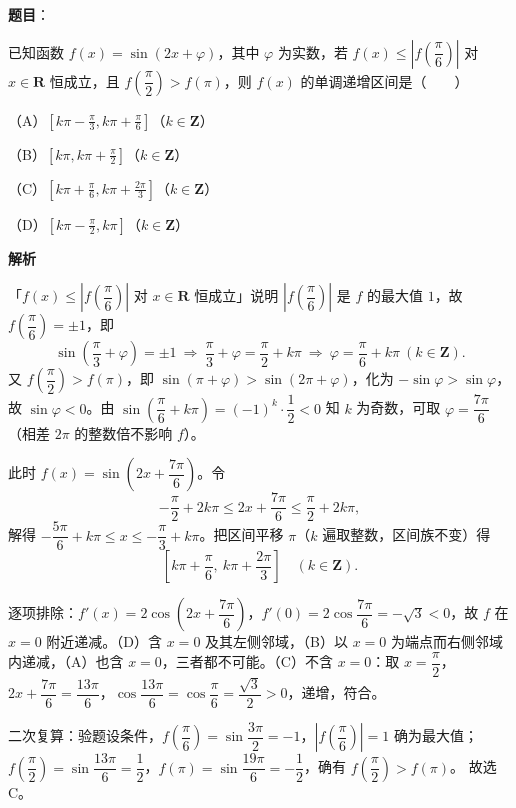 \begin{answer}

\textbf{题目}：

已知函数 $f(x)=\sin(2x+\varphi)$，其中 $\varphi$ 为实数，若 $f(x)\leqslant\left|f\left(\dfrac{\pi}{6}\right)\right|$ 对 $x\in\mathbf R$ 恒成立，且 $f\left(\dfrac{\pi}{2}\right)>f(\pi)$，则 $f(x)$ 的单调递增区间是\mbox{（　　）}

（A）$\left[k\pi-\frac{\pi}{3},k\pi+\frac{\pi}{6}\right]$（$k\in\mathbf Z$）

（B）$\left[k\pi,k\pi+\frac{\pi}{2}\right]$（$k\in\mathbf Z$）

（C）$\left[k\pi+\frac{\pi}{6},k\pi+\frac{2\pi}{3}\right]$（$k\in\mathbf Z$）

（D）$\left[k\pi-\frac{\pi}{2},k\pi\right]$（$k\in\mathbf Z$）

\textbf{解析}

「$f(x)\leqslant\left|f\left(\dfrac{\pi}{6}\right)\right|$ 对 $x\in\mathbf R$ 恒成立」说明 $\left|f\left(\dfrac{\pi}{6}\right)\right|$ 是 $f$ 的最大值 $1$，故 $f\left(\dfrac{\pi}{6}\right)=\pm1$，即
\nopagebreak[4]
\[\sin\left(\frac{\pi}{3}+\varphi\right)=\pm1\ \Longrightarrow\ \frac{\pi}{3}+\varphi=\frac{\pi}{2}+k\pi\ \Longrightarrow\ \varphi=\frac{\pi}{6}+k\pi\ (k\in\mathbf Z).\]
又 $f\left(\dfrac{\pi}{2}\right)>f(\pi)$，即 $\sin(\pi+\varphi)>\sin(2\pi+\varphi)$，化为 $-\sin\varphi>\sin\varphi$，故 $\sin\varphi<0$。由 $\sin\left(\dfrac{\pi}{6}+k\pi\right)=(-1)^k\cdot\dfrac12<0$ 知 $k$ 为奇数，可取 $\varphi=\dfrac{7\pi}{6}$（相差 $2\pi$ 的整数倍不影响 $f$）。

此时 $f(x)=\sin\left(2x+\dfrac{7\pi}{6}\right)$。令
\nopagebreak[4]
\[-\frac{\pi}{2}+2k\pi\leqslant2x+\frac{7\pi}{6}\leqslant\frac{\pi}{2}+2k\pi,\]
解得 $-\dfrac{5\pi}{6}+k\pi\leqslant x\leqslant-\dfrac{\pi}{3}+k\pi$。把区间平移 $\pi$（$k$ 遍取整数，区间族不变）得
\nopagebreak[4]
\[\left[k\pi+\frac{\pi}{6},\ k\pi+\frac{2\pi}{3}\right]\quad(k\in\mathbf Z).\]

逐项排除：$f'(x)=2\cos\left(2x+\dfrac{7\pi}{6}\right)$，$f'(0)=2\cos\dfrac{7\pi}{6}=-\sqrt3<0$，故 $f$ 在 $x=0$ 附近递减。（D）含 $x=0$ 及其左侧邻域，（B）以 $x=0$ 为端点而右侧邻域内递减，（A）也含 $x=0$，三者都不可能。（C）不含 $x=0$：取 $x=\dfrac{\pi}{2}$，$2x+\dfrac{7\pi}{6}=\dfrac{13\pi}{6}$，$\cos\dfrac{13\pi}{6}=\cos\dfrac{\pi}{6}=\dfrac{\sqrt3}{2}>0$，递增，符合。

二次复算：验题设条件，$f\left(\dfrac{\pi}{6}\right)=\sin\dfrac{3\pi}{2}=-1$，$\left|f\left(\dfrac{\pi}{6}\right)\right|=1$ 确为最大值；$f\left(\dfrac{\pi}{2}\right)=\sin\dfrac{13\pi}{6}=\dfrac12$，$f(\pi)=\sin\dfrac{19\pi}{6}=-\dfrac12$，确有 $f\left(\dfrac{\pi}{2}\right)>f(\pi)$。
故选 C。


\end{answer}

